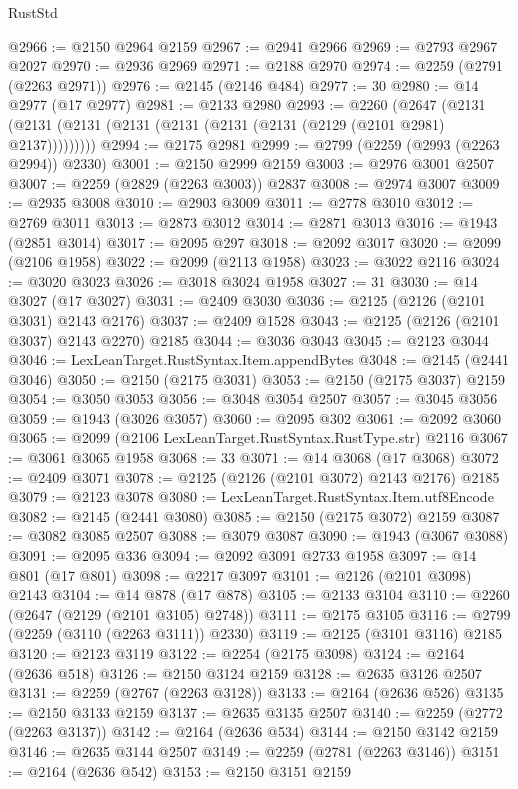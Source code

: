 \begin{lexlean}{RustStd}
\begin{coremodule}
@2966 := @2150 @2964 @2159
@2967 := @2941 @2966
@2969 := @2793 @2967 @2027
@2970 := @2936 @2969
@2971 := @2188 @2970
@2974 := @2259 (@2791 (@2263 @2971))
@2976 := @2145 (@2146 @484)
@2977 := 30
@2980 := @14 @2977 (@17 @2977)
@2981 := @2133 @2980
@2993 := @2260
    (@2647 (@2131 (@2131 (@2131 (@2131 (@2131 (@2131 (@2131 (@2129 (@2101 @2981) @2137)))))))))
@2994 := @2175 @2981
@2999 := @2799 (@2259 (@2993 (@2263 @2994)) @2330)
@3001 := @2150 @2999 @2159
@3003 := @2976 @3001 @2507
@3007 := @2259 (@2829 (@2263 @3003)) @2837
@3008 := @2974 @3007
@3009 := @2935 @3008
@3010 := @2903 @3009
@3011 := @2778 @3010
@3012 := @2769 @3011
@3013 := @2873 @3012
@3014 := @2871 @3013
@3016 := @1943 (@2851 @3014)
@3017 := @2095 @297
@3018 := @2092 @3017
@3020 := @2099 (@2106 @1958)
@3022 := @2099 (@2113 @1958)
@3023 := @3022 @2116
@3024 := @3020 @3023
@3026 := @3018 @3024 @1958
@3027 := 31
@3030 := @14 @3027 (@17 @3027)
@3031 := @2409 @3030
@3036 := @2125 (@2126 (@2101 @3031) @2143 @2176)
@3037 := @2409 @1528
@3043 := @2125 (@2126 (@2101 @3037) @2143 @2270) @2185
@3044 := @3036 @3043
@3045 := @2123 @3044
@3046 := LexLeanTarget.RustSyntax.Item.appendBytes
@3048 := @2145 (@2441 @3046)
@3050 := @2150 (@2175 @3031)
@3053 := @2150 (@2175 @3037) @2159
@3054 := @3050 @3053
@3056 := @3048 @3054 @2507
@3057 := @3045 @3056
@3059 := @1943 (@3026 @3057)
@3060 := @2095 @302
@3061 := @2092 @3060
@3065 := @2099 (@2106 LexLeanTarget.RustSyntax.RustType.str) @2116
@3067 := @3061 @3065 @1958
@3068 := 33
@3071 := @14 @3068 (@17 @3068)
@3072 := @2409 @3071
@3078 := @2125 (@2126 (@2101 @3072) @2143 @2176) @2185
@3079 := @2123 @3078
@3080 := LexLeanTarget.RustSyntax.Item.utf8Encode
@3082 := @2145 (@2441 @3080)
@3085 := @2150 (@2175 @3072) @2159
@3087 := @3082 @3085 @2507
@3088 := @3079 @3087
@3090 := @1943 (@3067 @3088)
@3091 := @2095 @336
@3094 := @2092 @3091 @2733 @1958
@3097 := @14 @801 (@17 @801)
@3098 := @2217 @3097
@3101 := @2126 (@2101 @3098) @2143
@3104 := @14 @878 (@17 @878)
@3105 := @2133 @3104
@3110 := @2260 (@2647 (@2129 (@2101 @3105) @2748))
@3111 := @2175 @3105
@3116 := @2799 (@2259 (@3110 (@2263 @3111)) @2330)
@3119 := @2125 (@3101 @3116) @2185
@3120 := @2123 @3119
@3122 := @2254 (@2175 @3098)
@3124 := @2164 (@2636 @518)
@3126 := @2150 @3124 @2159
@3128 := @2635 @3126 @2507
@3131 := @2259 (@2767 (@2263 @3128))
@3133 := @2164 (@2636 @526)
@3135 := @2150 @3133 @2159
@3137 := @2635 @3135 @2507
@3140 := @2259 (@2772 (@2263 @3137))
@3142 := @2164 (@2636 @534)
@3144 := @2150 @3142 @2159
@3146 := @2635 @3144 @2507
@3149 := @2259 (@2781 (@2263 @3146))
@3151 := @2164 (@2636 @542)
@3153 := @2150 @3151 @2159

\end{coremodule}
\end{lexlean}
